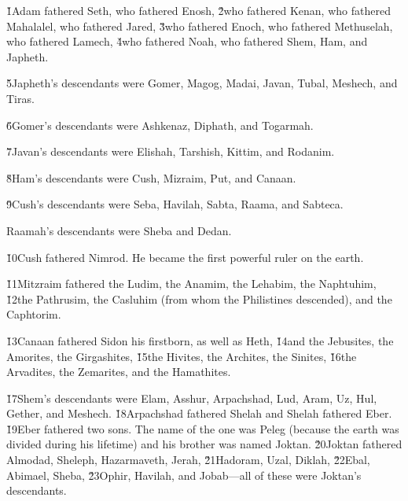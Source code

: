 


\v{1}Adam fathered Seth, who fathered Enosh, \v{2}who fathered Kenan, who fathered Mahalalel, who fathered Jared, \v{3}who fathered Enoch, who fathered Methuselah, who fathered Lamech, \v{4}who fathered Noah, who fathered Shem, Ham, and Japheth.

\v{5}Japheth's descendants were Gomer, Magog, Madai, Javan, Tubal, Meshech, and Tiras.

\v{6}Gomer's descendants were Ashkenaz, Diphath, and Togarmah.

\v{7}Javan's descendants were Elishah, Tarshish, Kittim, and Rodanim.

\v{8}Ham's descendants were Cush, Mizraim, Put, and Canaan.

\v{9}Cush's descendants were Seba, Havilah, Sabta, Raama, and Sabteca.

Raamah's descendants were Sheba and Dedan.

\v{10}Cush fathered Nimrod. He became the first powerful ruler on the earth.

\v{11}Mitzraim fathered the Ludim, the Anamim, the Lehabim, the Naphtuhim, \v{12}the Pathrusim, the Casluhim (from whom the Philistines descended), and the Caphtorim.

\v{13}Canaan fathered Sidon his firstborn, as well as Heth, \v{14}and the Jebusites, the Amorites, the Girgashites, \v{15}the Hivites, the Archites, the Sinites, \v{16}the Arvadites, the Zemarites, and the Hamathites.

\v{17}Shem's descendants were Elam, Asshur, Arpachshad, Lud, Aram, Uz, Hul, Gether, and Meshech. \v{18}Arpachshad fathered Shelah and Shelah fathered Eber. \v{19}Eber fathered two sons. The name of the one was Peleg (because the earth was divided during his lifetime) and his brother was named Joktan. \v{20}Joktan fathered Almodad, Sheleph, Hazarmaveth, Jerah, \v{21}Hadoram, Uzal, Diklah, \v{22}Ebal, Abimael, Sheba, \v{23}Ophir, Havilah, and Jobab---all of these were Joktan's descendants.

